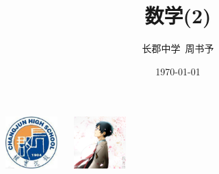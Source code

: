 \documentclass{beamer}
\title{数学(2)}
\author{长郡中学\ 周书予}
\date{\today}
\begin{document}
\small
	\begin{frame}
	\titlepage
		\begin{center}
		\includegraphics[width=2.0cm]{cj.jpg}
		$\ \ \ \ \ $
		\includegraphics[width=2.0cm]{zsy.png}
		\end{center}
	\end{frame}
\end{document}
